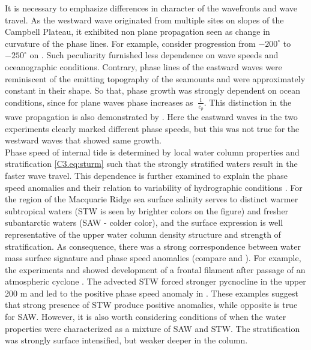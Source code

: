 \documentclass[12pt]{article}
\begin{document}
It is necessary to emphasize differences in character of the wavefronts and wave travel. As the 
westward 
wave originated from multiple sites on slopes of the Campbell Plateau, it exhibited non plane 
propagation seen as change in 
curvature of the phase lines. For example, consider progression from $-200^{\circ}$ to 
$-250^{\circ}$ on . Such peculiarity furnished less dependence on 
wave speeds and oceanographic conditions. Contrary, phase lines of the eastward waves were 
reminiscent of the emitting 
topography of the seamounts and were approximately constant in their shape. So that, phase growth 
was strongly dependent on ocean conditions, since for plane waves phase increases as  
$~\frac{1}{c_p}$. This distinction in the wave propagation is also 
demonstrated by . Here the eastward waves in the two experiments clearly 
marked different phase speeds, but this was not true for the westward waves that showed same 
growth.\\

Phase speed of internal tide is determined by local water column properties and stratification 
\eqref{C3.eq:sturm} such that the strongly stratified waters result in the faster wave travel. This 
dependence is further examined to explain the phase speed anomalies and their relation to 
variability of hydrographic conditions . For the region of the Macquarie 
Ridge sea surface salinity serves to distinct warmer subtropical waters (STW is seen by brighter 
colors on the figure) and fresher subantarctic waters (SAW - colder color), and the surface 
expression is well representative of the upper water column density structure and strength of 
stratification. As consequence, there was a strong correspondence between water mass surface 
signature and phase speed anomalies (compare  and 
). For 
example, the experiments  and  showed development of a frontal filament 
after passage of an atmospheric cyclone . The advected STW forced 
stronger pycnocline in the upper 200 m  and led to the positive phase speed anomaly in . These examples suggest that 
strong presence of STW produce positive anomalies, while opposite is true for SAW. 
However, it is also worth considering conditions of  when the water properties were 
characterized as a mixture of SAW and STW. The stratification was strongly surface intensified, but 
weaker deeper in the column.\\
\end{document}
